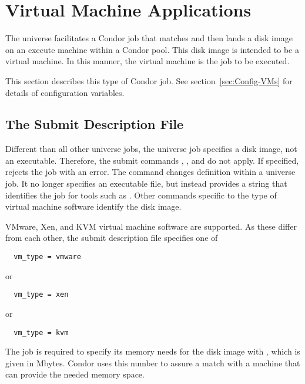 \section{\label{sec:vmuniverse}Virtual Machine Applications}

The  universe facilitates a Condor job
that matches and then lands a disk image on an execute machine
within a Condor pool.
This disk image is intended to be a virtual machine.
In this manner, the virtual machine is the job to be executed.

This section describes this type of Condor job.
See section~\ref{sec:Config-VMs}
for details of configuration variables.

\subsection{\label{sec:vm-submitfile}The Submit Description File}

Different than all other universe jobs,
the  universe job specifies a disk image,
not an executable.
Therefore, the submit commands , ,
and  do not apply.
If specified,  rejects the job with an error.
The  command changes definition within a
 universe job.
It no longer specifies an executable file, but instead
provides a string that identifies the job for tools such
as .
Other commands specific to the type of virtual machine software
identify the disk image.

VMware, Xen, and KVM virtual machine software are supported.
As these differ from each other, the submit description file
specifies one of
\begin{verbatim}
  vm_type = vmware
\end{verbatim}
or
\begin{verbatim}
  vm_type = xen
\end{verbatim}
or
\begin{verbatim}
  vm_type = kvm
\end{verbatim}

The job is required to specify its memory needs 
for the disk image with ,
which is given in Mbytes.
Condor uses this number to assure a match with a machine
that can provide the needed memory space.

